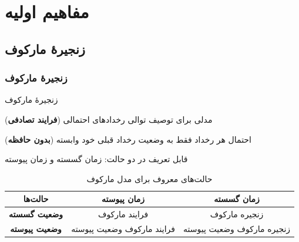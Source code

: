 \documentclass[xcolor=dvipsnames, professionalfonts, aspectratio=169, 11pt]{beamer}
\begin{document}
\section{مفاهیم اولیه}
\subsection{زنجیرهٔ مارکوف}
\begin{frame}
    \frametitle{زنجیرهٔ مارکوف}

    زنجیرهٔ مارکوف
    \begin{moredi}
        \item مدلی برای توصیف توالی رخدادهای احتمالی (\textbf{فرایند تصادفی})
        \item احتمال هر رخداد فقط به وضعیت رخداد قبلی خود وابسته (\textbf{بدون حافظه})
        \item قابل تعریف در دو حالت: زمان گسسته و زمان پیوسته
    \end{moredi}
    \pause
    \begin{table}
        \caption{حالت‌های معروف برای مدل مارکوف}
        \vspace{-1em}
        \small
        \begin{tabular}{|c|c|c|}
            \hline
            \textbf{حالت‌ها}       & \textbf{زمان پیوسته}       & \textbf{زمان گسسته}        \\
            \hline
            \textbf{وضعیت گسسته}  & فرایند مارکوف              & زنجیره مارکوف              \\
            \hline
            \textbf{وضعیت پیوسته} & فرایند مارکوف وضعیت پیوسته & زنجیره مارکوف وضعیت پیوسته \\
            \hline
        \end{tabular}
    \end{table}

\end{frame}
\end{document}
